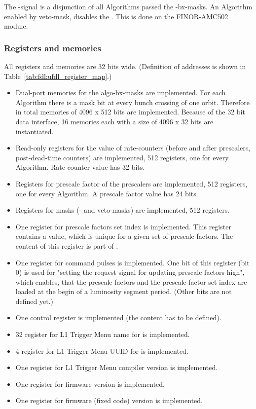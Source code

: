 The \finor-signal is a disjunction of all Algorithms passed the \finor-bx-masks. An Algorithm enabled by veto-mask, disables the \finor. This is done on the FINOR-AMC502 module.

\clearpage
\subsubsection{Registers and memories}
\label{sec:fdl:reg_mem}

All registers and memories are 32 bits wide. (Definition of addresses is shown in Table~\ref{tab:fdl:ufdl_register_map}.)

\begin {itemize}
\item Dual-port memories for the algo-bx-masks are implemented. For each Algorithm there is a mask bit at every bunch crossing of one orbit. Therefore in total memories of 4096 x 512 bits
are implemented. Because of the 32 bit data interface, 16 memories each with a size of 4096 x 32 bits are instantiated.
\item Read-only registers for the value of rate-counters (before and after prescalers, post-dead-time counters) are implemented, 512 registers, one for every Algorithm. Rate-counter value has 32 bits.
\item Registers for prescale factor of the prescalers are implemented, 512 registers, one for every Algorithm. A prescale factor value has 24 bits.
\item Registers for masks (\finor- and veto-masks) are implemented, 512 registers.
\item One register for prescale factors set index is implemented. This register contains a value, which is unique for a given set of prescale factors. The content of this register is
part of \record.
\item One register for command pulses is implemented. One bit of this register (bit 0) is used for "setting the request signal for updating prescale factors high", which enables, that the prescale factors and the prescale factor set index
are loaded at the begin of a luminosity segment period. (Other bits are not defined yet.)
\item One control register is implemented (the content has to be defined).
\item 32 register for L1 Trigger Menu name for \ugtl is implemented.
\item 4 register for L1 Trigger Menu UUID for \ugtl is implemented.
\item One register for L1 Trigger Menu compiler version is implemented.
\item One register for \ufdl firmware version is implemented.
\item One register for \ugtl firmware (fixed code) version is implemented.
\end {itemize}

